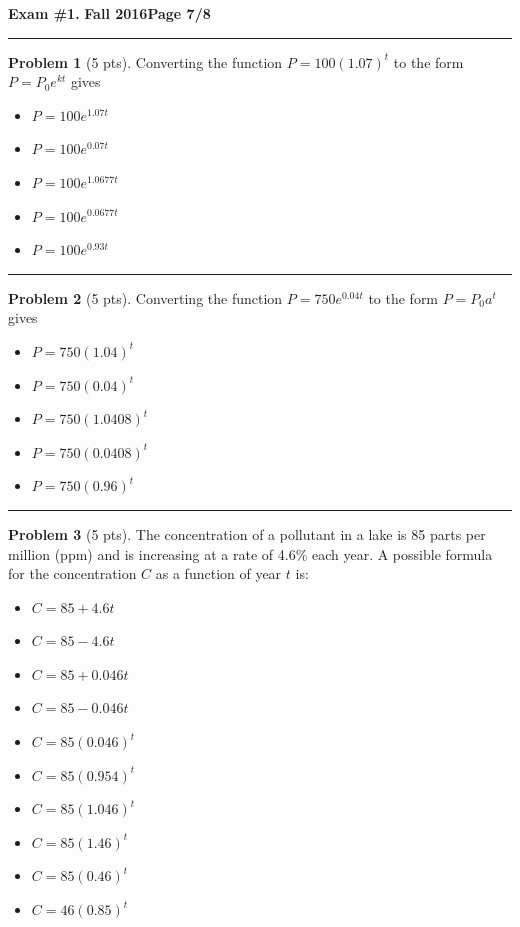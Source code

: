 \documentclass[12pt]{article}
\makeatletter
\theoremstyle{definition}
\newtheorem{problem}{Problem}
\newcommand*{\radiobutton}{%
  \@ifstar{\@radiobutton0}{\@radiobutton1}%
}
\newcommand*{\@radiobutton}[1]{%
  \begin{tikzpicture}
    \pgfmathsetlengthmacro\radius{height("X")/2}
    \draw[radius=\radius] circle;
    \ifcase#1 \fill[radius=.6*\radius] circle;\fi
  \end{tikzpicture}%
}
\makeatother
\begin{document}
\newpage 


\hfill{\large\bf Exam \#1.}\hfill{\large\bf
  Fall 2016}\hfill{\large\bf Page 7/8}\hrule

\bigskip
\begin{problem}[5 pts]
Converting the function $P = 100 (1.07)^t$ to the form $P = P_0e^{kt}$ gives
\begin{itemize}
\item[\radiobutton] $P = 100e^{1.07t}$
\item[\radiobutton] $P = 100 e^{0.07t}$
\item[\radiobutton] $P = 100 e^{1.0677t}$
\item[\radiobutton] $P = 100 e^{0.0677t}$
\item[\radiobutton] $P = 100 e^{0.93t}$
\end{itemize}
\end{problem}

\hrule


\begin{problem}[5 pts]
Converting the function $P = 750e^{0.04t}$ to the form $P = P_0a^t$ gives
\begin{itemize}
\item[\radiobutton] $P = 750 (1.04)^t$
\item[\radiobutton] $P = 750 (0.04)^t$
\item[\radiobutton] $P = 750 (1.0408)^t$
\item[\radiobutton] $P = 750 (0.0408)^t$
\item[\radiobutton] $P = 750 (0.96)^t$
\end{itemize}
\end{problem}
\hrule

\begin{problem}[5 pts]
The concentration of a pollutant in a lake is 85 parts per million (ppm) and is increasing at a rate of 4.6\% each year. A possible formula for the concentration $C$ as a function of year $t$ is:
\begin{itemize}
\item[\radiobutton] $C = 85 + 4.6t$
\item[\radiobutton] $C = 85 - 4.6t$
\item[\radiobutton] $C = 85 + 0.046t$
\item[\radiobutton] $C = 85 - 0.046t$
\item[\radiobutton] $C = 85(0.046)^t$
\item[\radiobutton] $C = 85(0.954)^t$
\item[\radiobutton] $C = 85(1.046)^t$
\item[\radiobutton] $C = 85(1.46)^t$
\item[\radiobutton] $C = 85(0.46)^t$
\item[\radiobutton] $C = 46(0.85)^t$
\end{itemize}
\end{problem}
\newpage
\end{document}
